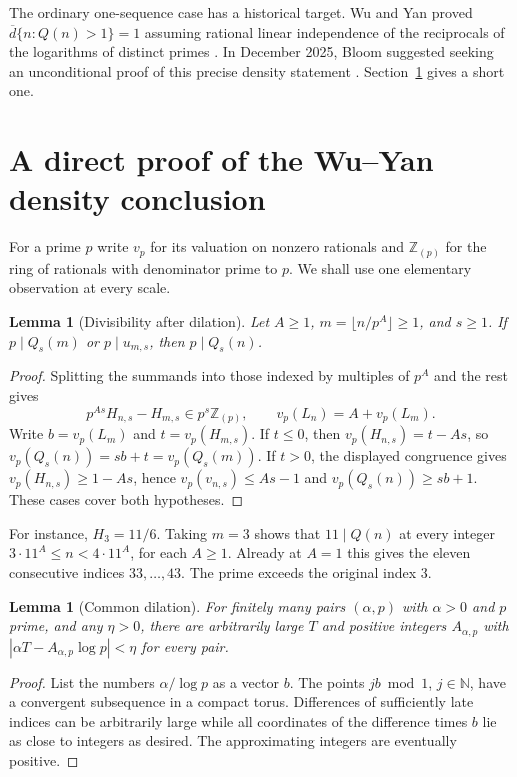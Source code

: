 \documentclass[11pt,a4paper,oneside,openany]{report}
\newtheorem{lemma}[theorem]{Lemma}\newtheorem{proposition}[theorem]{Proposition}
\theoremstyle{remark}\newtheorem{remark}[theorem]{Remark}
\numberwithin{equation}{section}
\newcommand{\Z}{\mathbb Z}\newcommand{\N}{\mathbb N}
\newcommand{\dens}{\overline d}\newcommand{\lcm}{\operatorname{lcm}}
\begin{document}
The ordinary one-sequence case has a historical target. Wu and Yan proved $\dens\{n:Q(n)>1\}=1$ assuming rational linear independence of the reciprocals of the logarithms of distinct primes \cite[Theorem 2]{wy}. In December 2025, Bloom suggested seeking an unconditional proof of this precise density statement \cite{bloom}. Section~\ref{ch8:sec:short} gives a short one.

\section{A direct proof of the Wu--Yan density conclusion}\label{ch8:sec:short}
For a prime $p$ write $v_p$ for its valuation on nonzero rationals and $\Z_{(p)}$ for the ring of rationals with denominator prime to $p$. We shall use one elementary observation at every scale.
\begin{lemma}[Divisibility after dilation]\label{ch8:lem:transfer}
Let $A\ge1$, $m=\lfloor n/p^A\rfloor\ge1$, and $s\ge1$. If $p\mid Q_s(m)$ or $p\mid u_{m,s}$, then $p\mid Q_s(n)$.
\end{lemma}
\begin{proof}
Splitting the summands into those indexed by multiples of $p^A$ and the rest gives
\[
 p^{As}H_{n,s}-H_{m,s}\in p^s\Z_{(p)},\qquad v_p(L_n)=A+v_p(L_m).
\]
Write $b=v_p(L_m)$ and $t=v_p(H_{m,s})$. If $t\le0$, then $v_p(H_{n,s})=t-As$, so $v_p(Q_s(n))=sb+t=v_p(Q_s(m))$. If $t>0$, the displayed congruence gives $v_p(H_{n,s})\ge1-As$, hence $v_p(v_{n,s})\le As-1$ and $v_p(Q_s(n))\ge sb+1$. These cases cover both hypotheses.
\end{proof}

For instance, $H_3=11/6$. Taking $m=3$ shows that $11\mid Q(n)$ at every integer $3\cdot11^A\le n<4\cdot11^A$, for each $A\ge1$. Already at $A=1$ this gives the eleven consecutive indices $33,\ldots,43$. The prime exceeds the original index $3$.

\begin{lemma}[Common dilation]\label{ch8:lem:return}
For finitely many pairs $(\alpha,p)$ with $\alpha>0$ and $p$ prime, and any $\eta>0$, there are arbitrarily large $T$ and positive integers $A_{\alpha,p}$ with $|\alpha T-A_{\alpha,p}\log p|<\eta$ for every pair.
\end{lemma}
\begin{proof}
List the numbers $\alpha/\log p$ as a vector $b$. The points $jb\bmod 1$, $j\in\N$, have a convergent subsequence in a compact torus. Differences of sufficiently late indices can be arbitrarily large while all coordinates of the difference times $b$ lie as close to integers as desired. The approximating integers are eventually positive.
\end{proof}
\end{document}
